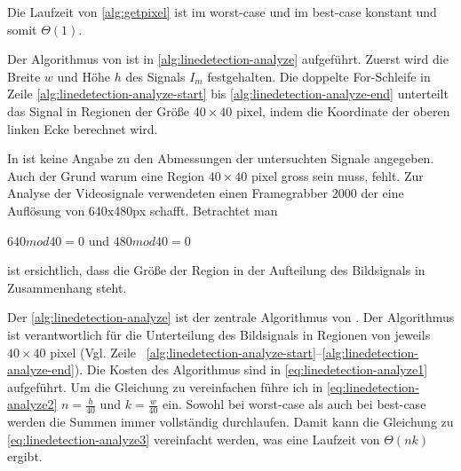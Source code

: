 

Die Laufzeit von \autoref{alg:getpixel} ist im worst-case und im best-case konstant und somit $\Theta(1)$.

Der Algorithmus von \citeauthor{clarke96} ist in \autoref{alg:linedetection-analyze} aufgeführt. Zuerst wird die Breite
 $w$ und Höhe $h$ des Signals $I_m$ festgehalten. Die doppelte For-Schleife in Zeile
 \ref{alg:linedetection-analyze-start} bis \ref{alg:linedetection-analyze-end} unterteilt das Signal in Regionen der
 Größe $40 \times 40$ \gls{pixel}, indem die Koordinate der oberen linken Ecke berechnet wird.



In \citeauthor{clarke96} ist keine Angabe zu den Abmessungen der untersuchten Signale angegeben. Auch der Grund warum
 eine Region $40 \times 40$ \gls{pixel} gross sein muss, fehlt. Zur Analyse der Videosignale verwendeten
 \citeauthor{clarke96} einen Framegrabber 2000 der eine Auflösung von 640x480px schafft. Betrachtet man

$640 mod 40 = 0$ und $480 mod 40 = 0$

ist ersichtlich, dass die Größe der Region in der Aufteilung des Bildsignals in Zusammenhang steht.

Der \autoref{alg:linedetection-analyze} ist der zentrale Algorithmus von \citeauthor{clarke96}. Der Algorithmus
 ist verantwortlich für die Unterteilung des Bildsignals in Regionen von jeweils $40 \times 40$ \gls{pixel} (Vgl. Zeile
~\ref{alg:linedetection-analyze-start}--\ref{alg:linedetection-analyze-end}). Die Kosten des Algorithmus sind in \autoref{eq:linedetection-analyze1} aufgeführt. Um die Gleichung zu vereinfachen führe ich in \autoref{eq:linedetection-analyze2} $n = \tfrac{h}{40}$ und $k = \tfrac{w}{40}$ ein. Sowohl bei worst-case als auch bei best-case werden die Summen immer vollständig durchlaufen. Damit kann die Gleichung zu \autoref{eq:linedetection-analyze3} vereinfacht werden, was eine Laufzeit von $\Theta(nk)$ ergibt.

